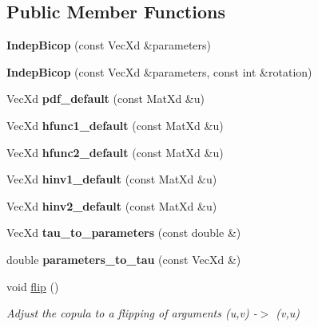 \subsection*{Public Member Functions}
\begin{DoxyCompactItemize}
\item 
{\bfseries Indep\+Bicop} (const Vec\+Xd \&parameters)\hypertarget{class_indep_bicop_ab9f48d3291ac99c34e33c2f29b133e5d}{}\label{class_indep_bicop_ab9f48d3291ac99c34e33c2f29b133e5d}

\item 
{\bfseries Indep\+Bicop} (const Vec\+Xd \&parameters, const int \&rotation)\hypertarget{class_indep_bicop_ad7ead44250e4f421ec491b2d2a7eb030}{}\label{class_indep_bicop_ad7ead44250e4f421ec491b2d2a7eb030}

\item 
Vec\+Xd {\bfseries pdf\+\_\+default} (const Mat\+Xd \&u)\hypertarget{class_indep_bicop_a533aeb27876d38d9836929a71b9bb223}{}\label{class_indep_bicop_a533aeb27876d38d9836929a71b9bb223}

\item 
Vec\+Xd {\bfseries hfunc1\+\_\+default} (const Mat\+Xd \&u)\hypertarget{class_indep_bicop_abac716dd22bc020d073d50dfc552c00e}{}\label{class_indep_bicop_abac716dd22bc020d073d50dfc552c00e}

\item 
Vec\+Xd {\bfseries hfunc2\+\_\+default} (const Mat\+Xd \&u)\hypertarget{class_indep_bicop_ae054353b15c15d68a02b36a804e54dfa}{}\label{class_indep_bicop_ae054353b15c15d68a02b36a804e54dfa}

\item 
Vec\+Xd {\bfseries hinv1\+\_\+default} (const Mat\+Xd \&u)\hypertarget{class_indep_bicop_a61e64923f5b5a142d093c5b706893b93}{}\label{class_indep_bicop_a61e64923f5b5a142d093c5b706893b93}

\item 
Vec\+Xd {\bfseries hinv2\+\_\+default} (const Mat\+Xd \&u)\hypertarget{class_indep_bicop_a426311d78e6142d6f57e5a09080f9239}{}\label{class_indep_bicop_a426311d78e6142d6f57e5a09080f9239}

\item 
Vec\+Xd {\bfseries tau\+\_\+to\+\_\+parameters} (const double \&)\hypertarget{class_indep_bicop_ae2bcd4c9c3fadb947cce3d1915ca6f57}{}\label{class_indep_bicop_ae2bcd4c9c3fadb947cce3d1915ca6f57}

\item 
double {\bfseries parameters\+\_\+to\+\_\+tau} (const Vec\+Xd \&)\hypertarget{class_indep_bicop_a1f9a8f4bf6d0fc6a053ded53eb35015a}{}\label{class_indep_bicop_a1f9a8f4bf6d0fc6a053ded53eb35015a}

\item 
void \hyperlink{class_indep_bicop_ab6e5a7670b984d685241b6c998ff3381}{flip} ()\hypertarget{class_indep_bicop_ab6e5a7670b984d685241b6c998ff3381}{}\label{class_indep_bicop_ab6e5a7670b984d685241b6c998ff3381}

\begin{DoxyCompactList}\small\item\em Adjust the copula to a flipping of arguments (u,v) -\/$>$ (v,u) \end{DoxyCompactList}\end{DoxyCompactItemize}
